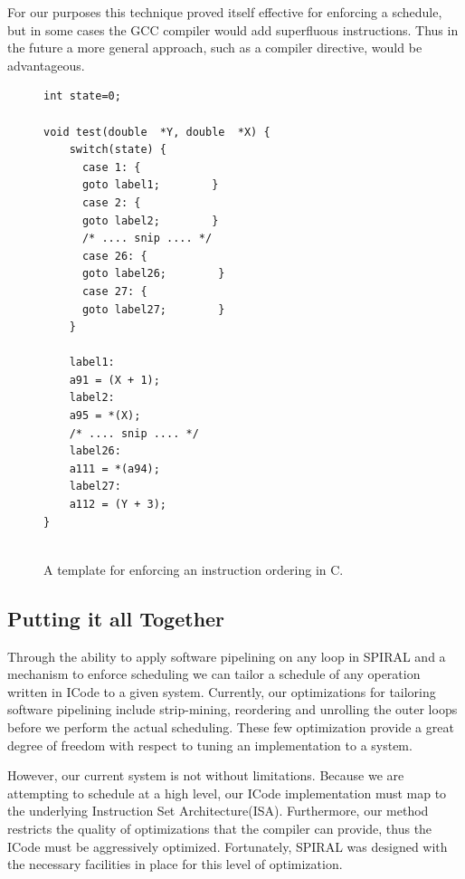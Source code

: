 \documentclass[10pt]{article}
\begin{document}
For our purposes this technique proved itself effective for enforcing a
schedule, but in some cases the GCC compiler would add superfluous instructions. Thus
in the future a more general approach, such as a compiler directive, would be
advantageous.


\begin{figure}[ht]
\begin{lstlisting}
int state=0;

void test(double  *Y, double  *X) {
    switch(state) {
      case 1: {
      goto label1;        }
      case 2: {
      goto label2;        }
      /* .... snip .... */
      case 26: {
      goto label26;        }
      case 27: {
      goto label27;        }
    }

    label1:
    a91 = (X + 1);
    label2:
    a95 = *(X);
    /* .... snip .... */
    label26:
    a111 = *(a94);
    label27:
    a112 = (Y + 3);
}


\end{lstlisting}
\caption{A template for enforcing an instruction ordering in C.}
\label{fig:force_sched}
\end{figure}


\subsection{Putting it all Together}

Through the ability to apply software pipelining on any loop in SPIRAL and a
mechanism to enforce scheduling we can tailor a schedule of any
operation written in ICode to a given system. Currently, our optimizations for
tailoring software pipelining include strip-mining, reordering and unrolling the
outer loops before we perform the actual scheduling. These few optimization
provide a great degree of freedom with respect to tuning an implementation to
a system.

However, our current system is not without limitations. Because we are
attempting to schedule at a high level, our ICode implementation must map to the
underlying Instruction Set Architecture(ISA). Furthermore, our method
restricts the quality of optimizations that the compiler can provide, thus the
ICode must be aggressively optimized. Fortunately, SPIRAL was designed with
the necessary facilities in place for this level of optimization.
\end{document}
